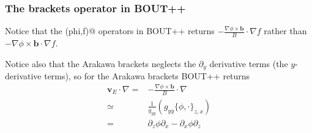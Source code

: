 \documentclass[12pt]{article}
\def\L{\left}
\def\R{\right}
\newcommand{\ve}[1]{\ensuremath{\boldsymbol{#1}}}
\begin{document}
\subsubsection{The brackets operator in BOUT++}
%
Notice that the \verb@brackets(phi,f)@ operators in BOUT++ returns
$-\frac{\nabla\phi\times\ve{b}}{B}\cdot\nabla f$ rather than
$-\nabla\phi\times\ve{b}\cdot\nabla f$.

Notice also that the Arakawa brackets neglects the $\partial_y$ derivative
terms (the $y$-derivative terms), so for the Arakawa brackets BOUT++ returns
%
\begin{align*}
    \ve{v}_E\cdot\nabla
    =& -\frac{\nabla\phi\times\ve{b}}{B}\cdot\nabla\\
    \simeq& \frac{1}{g_{yy}}
           \L(
                 g_{yy}\{\phi, \cdot\}_{z,x}
           \R)\\
    =& \partial_z\phi\partial_x - \partial_x\phi\partial_z
\end{align*}
%
\end{document}
